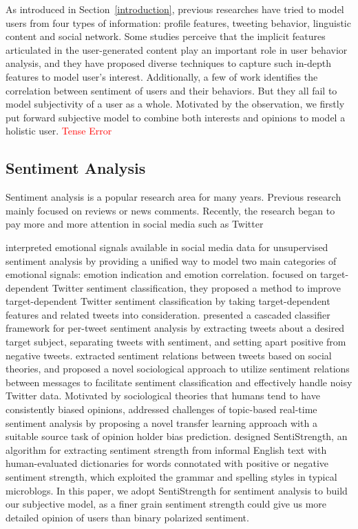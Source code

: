 \documentclass{acm_proc_article-sp}
\newcommand{\mo}[1]{\textcolor{red}{#1}}
\begin{document}
As introduced in Section~\ref{introduction}, previous researches have tried to model users from four types of information: profile features, tweeting behavior, linguistic content and social network. 
Some studies perceive that the implicit features articulated in the user-generated content play an important role in user behavior analysis,  and they have proposed diverse techniques to capture such in-depth features to model user's interest. 
Additionally, a few of work identifies the correlation between sentiment of users and their behaviors.
But they all fail to model subjectivity of a user as a whole.
Motivated by the observation, we firstly put forward subjective model to combine both interests and opinions to model a holistic user. \mo{Tense Error}

\subsection{Sentiment Analysis}
Sentiment analysis is a popular research area for many years. Previous research mainly focused on reviews or news comments. 
Recently, the research began to pay more and more attention in social media such as Twitter
 
\cite{Hu:2013www} interpreted emotional signals available in social media data for unsupervised sentiment analysis by providing a unified way to model two main categories of emotional signals: emotion indication and emotion correlation. 
\cite{Jiang:2011TTS} focused on target-dependent Twitter sentiment classification, they proposed a method to improve target-dependent Twitter sentiment classification by taking target-dependent features and related tweets into consideration. 
\cite{AsiaeeT:2012} presented a cascaded classifier framework for per-tweet sentiment analysis by extracting tweets about a desired target subject, separating tweets with sentiment, and setting apart positive from negative tweets.
\cite{Hu:2013ESR} extracted sentiment relations between tweets based on social theories, and proposed a novel sociological approach to utilize sentiment relations between messages to facilitate sentiment classification and effectively handle noisy Twitter data.
Motivated by sociological theories that humans tend to have consistently biased opinions, \cite{CalaisGuerra:2011BOT} addressed challenges of topic-based real-time sentiment analysis by proposing a novel transfer learning approach with a suitable source task of opinion holder bias prediction.
\cite{Thelwall:2010SSS,Thelwall:2012SSD} designed SentiStrength, an algorithm for extracting sentiment strength from informal English text with human-evaluated dictionaries for words connotated with positive or negative sentiment strength, which exploited the grammar and spelling styles in typical microblogs.
In this paper, we adopt SentiStrength for sentiment analysis to build our subjective model, as a finer grain sentiment strength could give us more detailed opinion of users than binary polarized sentiment.
\end{document}
